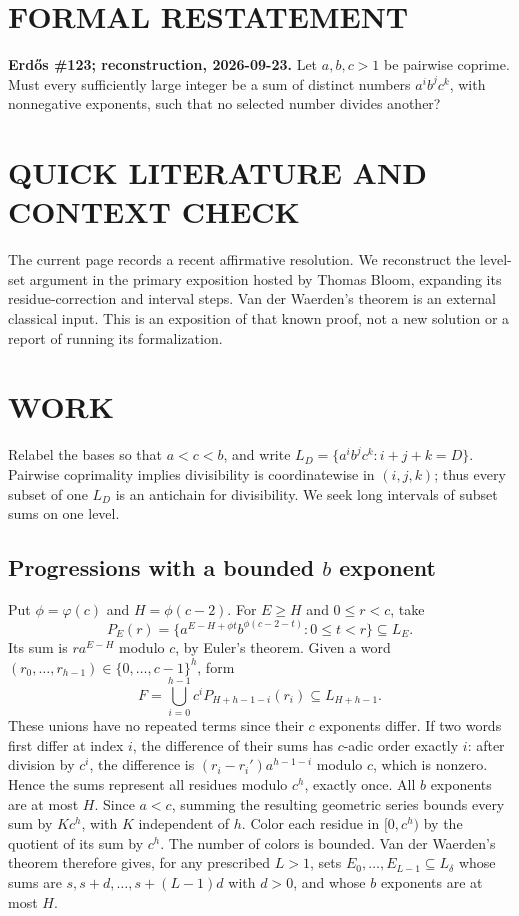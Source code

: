 \section{FORMAL RESTATEMENT}
\textbf{Erd\H{o}s \#123; reconstruction, 2026-09-23.}
Let $a,b,c>1$ be pairwise coprime. Must every sufficiently large integer
be a sum of distinct numbers $a^ib^jc^k$, with nonnegative exponents,
such that no selected number divides another?

\section{QUICK LITERATURE AND CONTEXT CHECK}
The current page records a recent affirmative resolution. We reconstruct
the level-set argument in the primary exposition hosted by Thomas Bloom,
expanding its residue-correction and interval steps. Van der Waerden's
theorem is an external classical input. This is an exposition of that
known proof, not a new solution or a report of running its formalization.

\section{WORK}
Relabel the bases so that $a<c<b$, and write
$L_D=\{a^ib^jc^k:i+j+k=D\}$. Pairwise coprimality implies divisibility
is coordinatewise in $(i,j,k)$; thus every subset of one $L_D$ is an
antichain for divisibility. We seek long intervals of subset sums on one
level.

\subsection*{Progressions with a bounded $b$ exponent}
Put $\phi=\varphi(c)$ and $H=\phi(c-2)$. For $E\ge H$ and
$0\le r<c$, take
\[
 P_E(r)=\{a^{E-H+\phi t}b^{\phi(c-2-t)}:0\le t<r\}\subseteq L_E.
\]
Its sum is $r a^{E-H}$ modulo $c$, by Euler's theorem. Given a word
$(r_0,\ldots,r_{h-1})\in\{0,\ldots,c-1\}^h$, form
\[
 F=\bigcup_{i=0}^{h-1}c^iP_{H+h-1-i}(r_i)\subseteq L_{H+h-1}.
\]
These unions have no repeated terms since their $c$ exponents differ.
If two words first differ at index $i$, the difference of their sums
has $c$-adic order exactly $i$: after division by $c^i$, the difference
is $(r_i-r_i')a^{h-1-i}$ modulo $c$, which is nonzero. Hence the sums
represent all residues modulo $c^h$, exactly once.
All $b$ exponents are at most $H$. Since $a<c$, summing the resulting
geometric series bounds every sum by $Kc^h$, with $K$ independent of
$h$. Color each residue in $[0,c^h)$ by the quotient of its sum by
$c^h$. The number of colors is bounded. Van der Waerden's theorem
therefore gives, for any prescribed $L>1$, sets
$E_0,\ldots,E_{L-1}\subseteq L_\delta$ whose sums are
$s,s+d,\ldots,s+(L-1)d$ with $d>0$, and whose $b$ exponents are at most
$H$.

